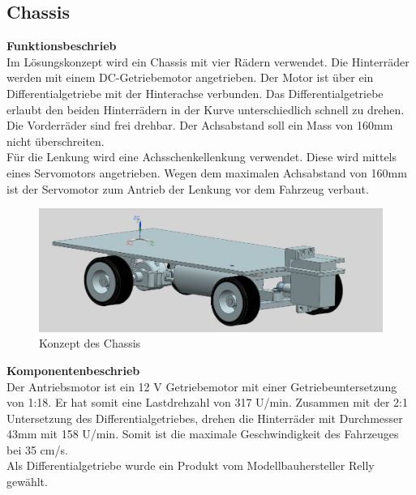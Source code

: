 \subsection{Chassis}
\textbf{Funktionsbeschrieb}\\[0.2cm]
Im Lösungskonzept wird ein Chassis mit vier Rädern verwendet. Die Hinterräder werden mit einem DC-Getriebemotor angetrieben. Der Motor ist über ein Differentialgetriebe mit der Hinterachse verbunden. Das Differentialgetriebe erlaubt den beiden Hinterrädern in der Kurve unterschiedlich schnell zu drehen. Die Vorderräder sind frei drehbar. Der Achsabstand soll ein Mass von 160mm nicht überschreiten.\\
Für die Lenkung wird eine Achsschenkellenkung verwendet. Diese wird mittels eines Servomotors angetrieben. Wegen dem maximalen Achsabstand von 160mm ist der Servomotor zum Antrieb der Lenkung vor dem Fahrzeug verbaut.
\begin{figure}[H]%
\centering
\includegraphics[width=1\textwidth]{03_Loesungskonzept/pictures/Chassis_2.JPG}
\caption{Konzept des Chassis}
\label{fig:activityRoute}
\end{figure}\flushleft
\textbf{Komponentenbeschrieb}\\[0.2cm]
Der Antriebsmotor ist ein 12 V Getriebemotor mit einer Getriebeuntersetzung von 1:18. Er hat somit eine Lastdrehzahl von 317 U/min. Zusammen mit der 2:1 Untersetzung des Differentialgetriebes, drehen die Hinterräder mit Durchmesser 43mm mit 158 U/min. Somit ist die maximale Geschwindigkeit des Fahrzeuges bei 35 cm/s.\\
Als Differentialgetriebe wurde ein Produkt vom Modellbauhersteller Relly gewählt.
